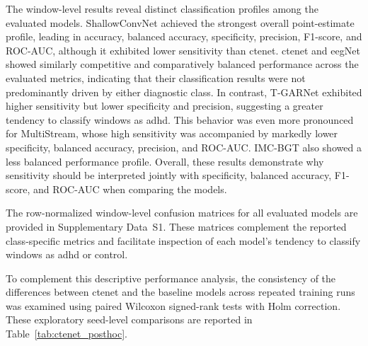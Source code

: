 {The window-level results reveal distinct classification profiles among the evaluated models. ShallowConvNet achieved the strongest overall point-estimate profile, leading in accuracy, balanced accuracy, specificity, precision, F1-score, and ROC-AUC, although it exhibited lower sensitivity than \gls{ctenet}. \gls{ctenet} and \gls{eeg}Net showed similarly competitive and comparatively balanced performance across the evaluated metrics, indicating that their classification results were not predominantly driven by either diagnostic class. In contrast, T-GARNet exhibited higher sensitivity but lower specificity and precision, suggesting a greater tendency to classify windows as \gls{adhd}. This behavior was even more pronounced for MultiStream, whose high sensitivity was accompanied by markedly lower specificity, balanced accuracy, precision, and ROC-AUC. IMC-BGT also showed a less balanced performance profile. Overall, these results demonstrate why sensitivity should be interpreted jointly with specificity, balanced accuracy, F1-score, and ROC-AUC when comparing the models.}

{The row-normalized window-level confusion matrices for all evaluated models are provided in Supplementary Data~S1. These matrices complement the reported class-specific metrics and facilitate inspection of each model's tendency to classify windows as \gls{adhd} or control.}

{To complement this descriptive performance analysis, the consistency of the differences between \gls{ctenet} and the baseline models across repeated training runs was examined using paired Wilcoxon signed-rank tests with Holm correction. These exploratory seed-level comparisons are reported in
Table~\ref{tab:ctenet_posthoc}.}

